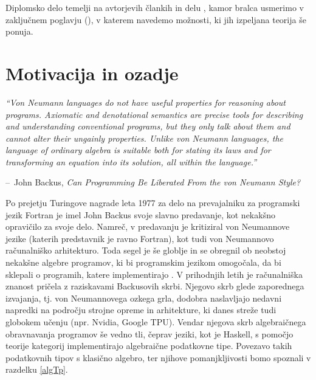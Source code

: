 \documentclass[a4paper, 12pt]{book}
\makeatletter
\newenvironment{chapquote}[2][2em]
  {\setlength{\@tempdima}{#1}%
   \def\chapquote@author{#2}%
   \parshape 1 \@tempdima \dimexpr\textwidth-2\@tempdima\relax%
   \itshape}
  {\par\normalfont\hfill--\ \chapquote@author\hspace*{\@tempdima}\par\bigskip}
\makeatother
\begin{document}
Diplomsko delo temelji na avtorjevih člankih \cite{opCalProg} \cite{dC++Paper} in delu \cite{dC++}\cite{dC++Man}, kamor bralca usmerimo v zaključnem poglavju (\emph{}), v katerem navedemo možnosti, ki jih izpeljana teorija še ponuja.

\chapter{Motivacija in ozadje}
\label{ch:MotivacijaInOzadje}

\begin{chapquote}{\small{John Backus, \textit{Can Programming Be Liberated From the von Neumann Style?}}}
``Von Neumann languages do not have useful properties for reasoning about programs. Axiomatic and denotational semantics are precise tools for describing and understanding conventional programs, but they only talk about them and cannot alter their ungainly properties. Unlike von Neumann languages, the language of ordinary algebra is suitable both for stating its laws and for transforming an equation into its solution, all within the language.''
\end{chapquote}

Po prejetju Turingove nagrade leta 1977 za delo na prevajalniku za programski jezik Fortran je imel John Backus svoje slavno predavanje, kot nekakšno opravičilo za svoje delo. Namreč, v predavanju je kritiziral von Neumannove jezike (katerih predstavnik je ravno Fortran), kot tudi von Neumannovo računalniško arhitekturo. Toda segel je še globlje in se obregnil ob neobstoj nekakšne algebre programov, ki bi programskim jezikom omogočala, da bi sklepali o programih, katere implementirajo \cite{backus}.
V prihodnjih letih je računalniška znanost pričela z raziskavami Backusovih skrbi. Njegovo skrb glede zaporednega izvajanja, tj. von Neumannovega ozkega grla, dodobra naslavljajo nedavni napredki na področju strojne opreme in arhitekture, ki danes streže tudi globokem učenju (npr. Nvidia, Google TPU). Vendar njegova skrb algebraičnega obravnavanja programov še vedno tli, čeprav jeziki, kot je Haskell, s pomočjo teorije kategorij implementirajo algebraične podatkovne tipe. Povezavo takih podatkovnih tipov s klasično algebro, ter njihove pomanjkljivosti bomo spoznali v razdelku \ref{algTp}.
\end{document}
